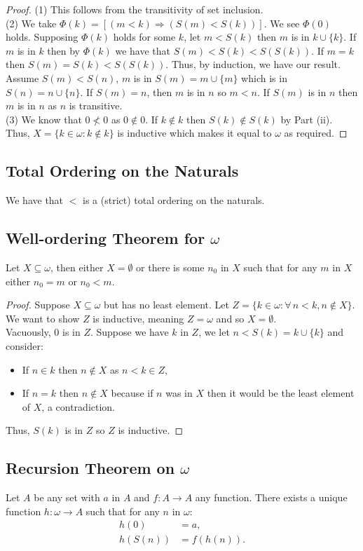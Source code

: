 \begin{proof}
    (1) This follows from the transitivity of set inclusion.
    \\[\baselineskip]
    (2) We take $\Phi(k) = [(m < k) \Rightarrow (S(m) < S(k))]$.
    We see $\Phi(0)$ holds. Supposing $\Phi(k)$ holds for some
    $k$, let $m < S(k)$ then $m$ is in $k \cup \{k\}$. If $m$ 
    is in $k$ then by $\Phi(k)$ we have that $S(m) < S(k) < S(S(k))$.
    If $m = k$ then $S(m) = S(k) < S(S(k))$. Thus, by induction, 
    we have our result.
    \\[\baselineskip]
    Assume $S(m) < S(n)$, $m$ is in $S(m) = m \cup \{m\}$ which
    is in $S(n) = n \cup \{n\}$. If $S(m) = n$, then $m$ is in $n$
    so $m < n$. If $S(m)$ is in $n$ then $m$ is in $n$ as $n$ is
    transitive.
    \\[\baselineskip]
    (3) We know that $0 \nless 0$ as $0 \notin 0$. If $k \notin k$
    then $S(k) \notin S(k)$ by Part (ii). Thus, 
    $X = \{k \in \omega : k \notin k\}$ is inductive which makes
    it equal to $\omega$ as required.
\end{proof}

\subsection{Total Ordering on the Naturals}

We have that $<$ is a (strict) total ordering on the naturals.

\subsection{Well-ordering Theorem for $\omega$}

Let $X \subseteq \omega$, then either $X = \emptyset$ or there is some
$n_0$ in $X$ such that for any $m$ in $X$ either $n_0 = m$ or $n_0 < m$.

\begin{proof}
    Suppose $X \subseteq \omega$ but has no least element.
    Let $Z = \{k \in \omega : \forall \, n < k, n \notin X\}$.
    We want to show $Z$ is inductive, meaning $Z = \omega$ and
    so $X = \emptyset$. 
    \\[\baselineskip]
    Vacuously, $0$ is in $Z$. Suppose we have $k$ in 
    $Z$, we let $n < S(k) = k \cup \{k\}$ and consider: \begin{itemize}
        \item If $n \in k$ then $n \notin X$ as $n < k \in Z$,
        \item If $n = k$ then $n \notin X$ because if $n$ was in $X$
            then it would be the least element of $X$, a contradiction.
    \end{itemize} Thus, $S(k)$ is in $Z$ so $Z$ is inductive.
\end{proof}

\subsection{Recursion Theorem on $\omega$}

Let $A$ be any set with $a$ in $A$ and $f : A \to A$ any function.
There exists a unique function $h : \omega \to A$ such that
for any $n$ in $\omega$:
\begin{align*}
    h(0) &= a, \\
    h(S(n)) &= f(h(n)).
\end{align*}